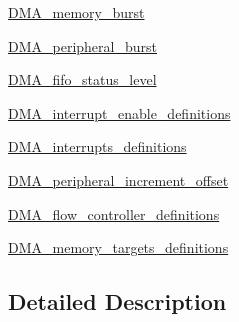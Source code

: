 \begin{DoxyCompactItemize}
\item 
\hyperlink{group___d_m_a__memory__burst}{D\-M\-A\-\_\-memory\-\_\-burst}
\item 
\hyperlink{group___d_m_a__peripheral__burst}{D\-M\-A\-\_\-peripheral\-\_\-burst}
\item 
\hyperlink{group___d_m_a__fifo__status__level}{D\-M\-A\-\_\-fifo\-\_\-status\-\_\-level}
\item 
\hyperlink{group___d_m_a__interrupt__enable__definitions}{D\-M\-A\-\_\-interrupt\-\_\-enable\-\_\-definitions}
\item 
\hyperlink{group___d_m_a__interrupts__definitions}{D\-M\-A\-\_\-interrupts\-\_\-definitions}
\item 
\hyperlink{group___d_m_a__peripheral__increment__offset}{D\-M\-A\-\_\-peripheral\-\_\-increment\-\_\-offset}
\item 
\hyperlink{group___d_m_a__flow__controller__definitions}{D\-M\-A\-\_\-flow\-\_\-controller\-\_\-definitions}
\item 
\hyperlink{group___d_m_a__memory__targets__definitions}{D\-M\-A\-\_\-memory\-\_\-targets\-\_\-definitions}
\end{DoxyCompactItemize}


\subsection{Detailed Description}
